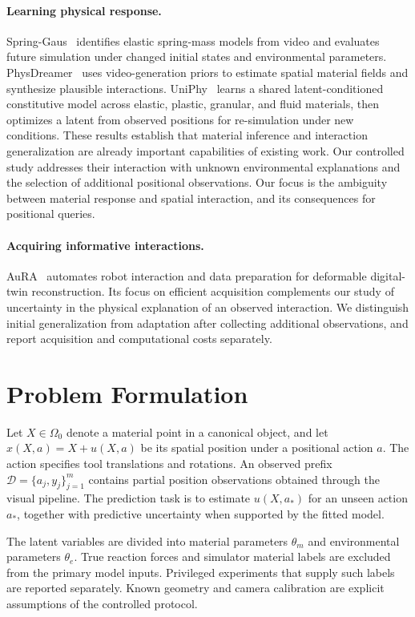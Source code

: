 \documentclass[10pt,twocolumn,letterpaper]{article}
\begin{document}
\paragraph{Learning physical response.}
Spring-Gaus~\cite{zhong2024springgaus} identifies elastic spring-mass models from video and evaluates future simulation under changed initial states and environmental parameters. PhysDreamer~\cite{zhang2024physdreamer} uses video-generation priors to estimate spatial material fields and synthesize plausible interactions. UniPhy~\cite{mittal2025uniphy} learns a shared latent-conditioned constitutive model across elastic, plastic, granular, and fluid materials, then optimizes a latent from observed positions for re-simulation under new conditions. These results establish that material inference and interaction generalization are already important capabilities of existing work. Our controlled study addresses their interaction with unknown environmental explanations and the selection of additional positional observations. Our focus is the ambiguity between material response and spatial interaction, and its consequences for positional queries.

\paragraph{Acquiring informative interactions.}
AuRA~\cite{yu2026aura} automates robot interaction and data preparation for deformable digital-twin reconstruction. Its focus on efficient acquisition complements our study of uncertainty in the physical explanation of an observed interaction. We distinguish initial generalization from adaptation after collecting additional observations, and report acquisition and computational costs separately.

\section{Problem Formulation}
Let $X\in\Omega_0$ denote a material point in a canonical object, and let $x(X,a)=X+u(X,a)$ be its spatial position under a positional action $a$. The action specifies tool translations and rotations. An observed prefix $\mathcal D=\{a_j,y_j\}_{j=1}^m$ contains partial position observations obtained through the visual pipeline. The prediction task is to estimate $u(X,a_*)$ for an unseen action $a_*$, together with predictive uncertainty when supported by the fitted model.

The latent variables are divided into material parameters $\theta_m$ and environmental parameters $\theta_e$. True reaction forces and simulator material labels are excluded from the primary model inputs. Privileged experiments that supply such labels are reported separately. Known geometry and camera calibration are explicit assumptions of the controlled protocol.
\end{document}
